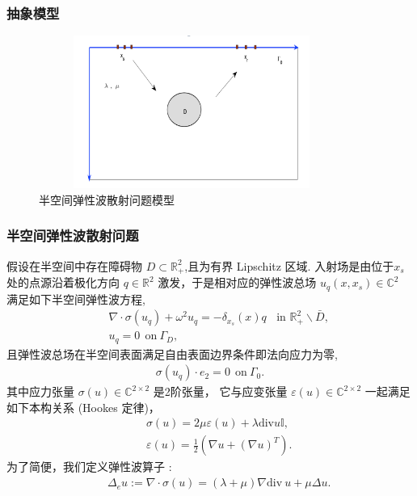\documentclass[8pt]{beamer}
\newcommand{\R}{\mathbb{R}}
\newcommand{\ep}{\varepsilon}
\newcommand{\na}{\nabla}
\newcommand{\Ga}{\Gamma}
\newcommand{\bks}{\backslash}
\renewcommand{\C}{{\mathbb{C}}}
\renewcommand{\div}{\mathrm{div}}
\newcommand{\ben}{\begin{eqnarray*}}
\newcommand{\een}{\end{eqnarray*}}
\begin{document}
\begin{frame}
\frametitle{抽象模型}
\begin{figure}
	\centering
	\includegraphics[width=10cm,height=5cm]{./figure/half_forward}
	\caption{半空间弹性波散射问题模型}
\end{figure}
\end{frame}

\begin{frame}
\frametitle{半空间弹性波散射问题}
假设在半空间中存在障碍物 $D\subset\R^2_+$,且为有界 Lipschitz 区域. 入射场是由位于$x_s$ 处的点源沿着极化方向 $q\in \R^2$ 激发，于是相对应的弹性波总场 $u_q(x,x_s)\in \C^2$ 满足如下半空间弹性波方程,
\ben\label{elastic_eq}
& &\nabla\cdot\sigma(u_q) + \omega^2u_q= -\delta_{x_s}(x)q \ \ \ \ \mbox{in }\R_+^2\bks \bar{D},\\
& &u_q=0 \ \ \mbox{on} \ \Ga_D  ,
\een
且弹性波总场在半空间表面满足自由表面边界条件即法向应力为零,
\ben
\sigma(u_q)\cdot e_2=0 \ \ \mbox{on} \ \Ga_0.
\een
其中应力张量 $\sigma(u)\in \C^{2\times2}$ 是2阶张量， 它与应变张量 $\ep(u)\in \C^{2\times2}$ 一起满足如下本构关系 (Hookes 定律)，
\ben
& &\sigma(u) = 2\mu\ep(u) + \lambda\div u \mathbb{I}, \\
& &\ep(u)=\frac{1}{2}(\na u +(\na u)^T).
\een
为了简便，我们定义弹性波算子 :
\ben
& &\Delta_e u:=\nabla\cdot\sigma(u)=(\lambda+\mu)\nabla\div \ u+\mu\Delta u.
\een
\end{frame}
\end{document}

